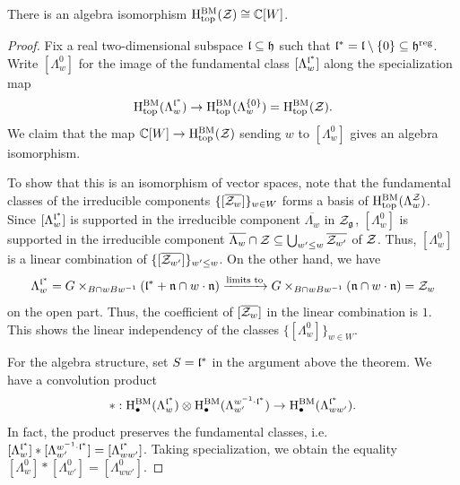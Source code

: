 \begin{theorem}[thm:]{}
    There is an algebra isomorphism $\mathrm{H}^\mathrm{BM}_\mathrm{top}(\mathcal{Z}) \cong \mathbb{C}[W]$.
    \begin{proof}
        Fix a real two-dimensional subspace $\mathfrak{l} \subseteq \mathfrak{h}$ such that $\mathfrak{l}^* = \mathfrak{l} \setminus \{ 0 \} \subseteq \mathfrak{h}^\mathrm{reg}$. Write $[\Lambda_w^0]$ for the image of the fundamental class $[\Lambda_w^{\mathfrak{l}^*}]$ along the specialization map
        \begin{equation*}
            \mathrm{H}^\mathrm{BM}_\mathrm{top}(\Lambda_w^{\mathfrak{l}^*}) \to \mathrm{H}^\mathrm{BM}_\mathrm{top}(\Lambda_w^{\{0\}}) = \mathrm{H}^\mathrm{BM}_\mathrm{top}(\mathcal{Z}).
        \end{equation*}
        We claim that the map $\mathbb{C}[W] \to \mathrm{H}^\mathrm{BM}_\mathrm{top}(\mathcal{Z})$ sending $w$ to $[\Lambda_w^0]$ gives an algebra isomorphism.
        
        To show that this is an isomorphism of vector spaces, note that the fundamental classes of the irreducible components $\{[\overline{\mathcal{Z}_w}]\}_{w \in W}$ forms a basis of $\mathrm{H}^\mathrm{BM}_\mathrm{top}(\Lambda_w^{\mathcal{Z}})$. Since $[\Lambda_w^{\mathfrak{l}^*}]$ is supported in the irreducible component $\overline{\Lambda_w}$ in $\mathcal{Z}_{\mathfrak{g}}$, $[\Lambda_w^0]$ is supported in the irreducible component $\overline{\Lambda_w} \cap \mathcal{Z} \subseteq \bigcup_{w' \leq w} \overline{\mathcal{Z}_{w'}}$ of $\mathcal{Z}$. Thus, $[\Lambda_w^0]$ is a linear combination of $\{[\overline{\mathcal{Z}_{w'}}]\}_{w' \leq w}$. On the other hand, we have
        \begin{equation*}
            \Lambda_w^{\mathfrak{l}^*} = G \times_{B \cap wBw^{-1}} (\mathfrak{l}^* + \mathfrak{n} \cap w \cdot \mathfrak{n}) \xrightarrow{\text{limits to}} G \times_{B \cap wBw^{-1}} (\mathfrak{n} \cap w \cdot \mathfrak{n}) = \mathcal{Z}_w
        \end{equation*}
        on the open part. Thus, the coefficient of $[\overline{\mathcal{Z}_w}]$ in the linear combination is $1$. This shows the linear independency of the classes $\{[\Lambda_w^0]\}_{w \in W}$.
        
        For the algebra structure, set $S = \mathfrak{l}^*$ in the argument above the theorem. We have a convolution product
        \begin{equation*}
            {*} : \mathrm{H}^\mathrm{BM}_\bullet(\Lambda_w^{\mathfrak{l}^*}) \otimes \mathrm{H}^\mathrm{BM}_\bullet(\Lambda_{w'}^{w^{-1} \cdot {\mathfrak{l}^*}}) \to \mathrm{H}^\mathrm{BM}_\bullet(\Lambda_{ww'}^{\mathfrak{l}^*}).
        \end{equation*}
        In fact, the product preserves the fundamental classes, i.e. $[\Lambda_w^{\mathfrak{l}^*}] * [\Lambda_{w'}^{w^{-1} \cdot {\mathfrak{l}^*}}] = [\Lambda_{ww'}^{\mathfrak{l}^*}]$. Taking specialization, we obtain the equality $[\Lambda_w^0] * [\Lambda_{w'}^0] = [\Lambda_{ww'}^0]$.
    \end{proof}
\end{theorem}
\fi

